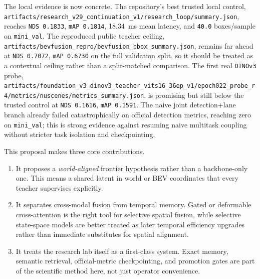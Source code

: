 \documentclass[11pt]{article}
\newcommand{\repo}[1]{\texttt{\nolinkurl{#1}}}
\begin{document}
The local evidence is now concrete. The repository's best trusted local control,
\repo{artifacts/research\_v29\_continuation\_v1/research\_loop/summary.json}, reaches
\texttt{NDS 0.1833}, \texttt{mAP 0.1814}, \SI{18.34}{ms} mean latency, and \texttt{40.0}
boxes/sample on \texttt{mini\_val}. The reproduced public teacher ceiling,
\repo{artifacts/bevfusion\_repro/bevfusion\_bbox\_summary.json}, remains far ahead at
\texttt{NDS 0.7072}, \texttt{mAP 0.6730} on the full validation split, so it should be treated as a
contextual ceiling rather than a split-matched comparison. The first real \texttt{DINOv3} probe,
\repo{artifacts/foundation\_v3\_dinov3\_teacher\_vits16\_36ep\_v1/epoch022\_probe\_r4/metrics/nuscenes/metrics\_summary.json},
is promising but still below the trusted control at \texttt{NDS 0.1616}, \texttt{mAP 0.1591}. The
naive joint detection+lane branch already failed catastrophically on official detection metrics,
reaching zero on \texttt{mini\_val}; this is strong evidence against resuming naive multitask
coupling without stricter task isolation and checkpointing.

This proposal makes three core contributions.
\begin{enumerate}[leftmargin=*,itemsep=2pt]
\item It proposes a \emph{world-aligned} frontier hypothesis rather than a backbone-only one. This means a
shared latent in world or BEV coordinates that every teacher supervises explicitly.
\item It separates cross-modal fusion from temporal memory. Gated or deformable
cross-attention is the right tool for selective spatial fusion, while selective state-space models
are better treated as later temporal efficiency upgrades rather than immediate substitutes for
spatial alignment.
\item It treats the research lab itself as a first-class system. Exact memory, semantic retrieval,
official-metric checkpointing, and promotion gates are part of the scientific method here, not just
operator convenience.
\end{enumerate}
\end{document}
